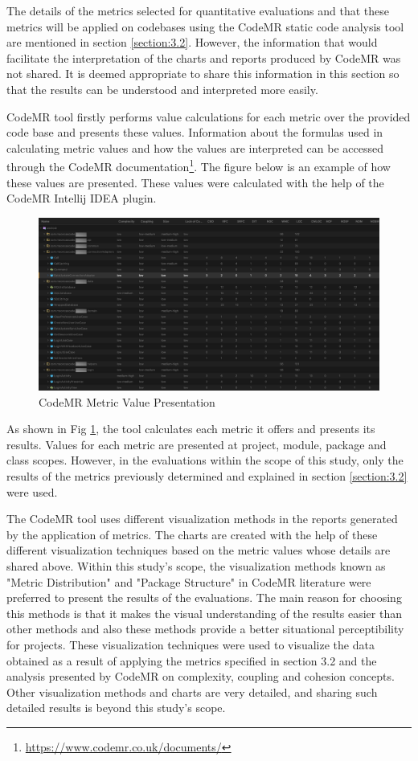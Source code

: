 The details of the metrics selected for quantitative evaluations and that these metrics will be applied on codebases using the CodeMR static code analysis tool are mentioned in section \ref{section:3.2}. However, the information that would facilitate the interpretation of the charts and reports produced by CodeMR was not shared. It is deemed appropriate to share this information in this section so that the results can be understood and interpreted more easily.

CodeMR tool firstly performs value calculations for each metric over the provided code base and presents these values. Information about the formulas used in calculating metric values and how the values are interpreted can be accessed through the CodeMR documentation\footnote{\label{fn:codemr} \url{https://www.codemr.co.uk/documents/}}. The figure below is an example of how these values are presented. These values were calculated with the help of the CodeMR Intellij IDEA plugin.
\begin{figure}[ht!]
    \centering
    \includegraphics[scale=0.34]{figures/code-mr-metric-val.png}
    \caption{CodeMR Metric Value Presentation}
    \label{fig:code-mr-metric-val}
\end{figure}
\FloatBarrier
As shown in Fig \ref{fig:code-mr-metric-val}, the tool calculates each metric it offers and presents its results. Values for each metric are presented at project, module, package and class scopes. However, in the evaluations within the scope of this study, only the results of the metrics previously determined and explained in section \ref{section:3.2} were used.

The CodeMR tool uses different visualization methods in the reports generated by the application of metrics. The charts are created with the help of these different visualization techniques based on the metric values whose details are shared above. Within this study's scope, the visualization methods known as "Metric Distribution" and "Package Structure" in CodeMR literature were preferred to present the results of the evaluations. The main reason for choosing this methods is that it makes the visual understanding of the results easier than other methods and also these methods provide a better situational perceptibility for projects. These visualization techniques were used to visualize the data obtained as a result of applying the metrics specified in section 3.2 and the analysis presented by CodeMR on complexity, coupling and cohesion concepts. Other visualization methods and charts are very detailed, and sharing such detailed results is beyond this study's scope. 

